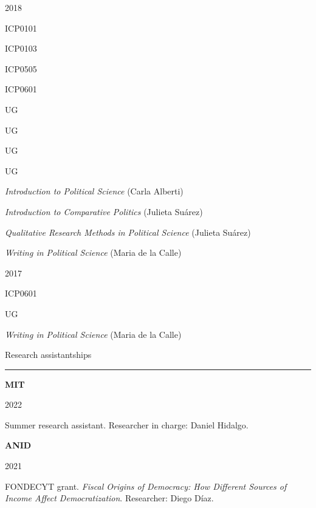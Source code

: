 \documentclass[a4paper, 12pt]{article}
\begin{document}
\begin{multicols}{4}

2018

\columnbreak

ICP0101

ICP0103

ICP0505

ICP0601

\columnbreak

UG

UG

UG

UG

\columnbreak

\textit{Introduction to Political Science} (Carla Alberti)

\textit{Introduction to Comparative Politics} (Julieta Suárez)

\textit{Qualitative Research Methods in Political Science} (Julieta Suárez)

\textit{Writing in Political Science} (Maria de la Calle)

\end{multicols}


\begin{multicols}{4}

2017

\columnbreak

ICP0601

\columnbreak

UG

\columnbreak

\textit{Writing in Political Science} (Maria de la Calle)

\end{multicols}




\large Research assistantships
\smallskip
\hrule
\normalsize


\begin{multicols}{3}

\textbf{MIT}

\columnbreak

2022

\columnbreak

Summer research assistant. Researcher in charge: Daniel Hidalgo.

\end{multicols}


\begin{multicols}{3}

\textbf{ANID}

\columnbreak

2021

\columnbreak

FONDECYT grant. \textit{Fiscal Origins of Democracy: How Different Sources of Income Affect Democratization}. Researcher: Diego Díaz.

\end{multicols}
\end{document}
